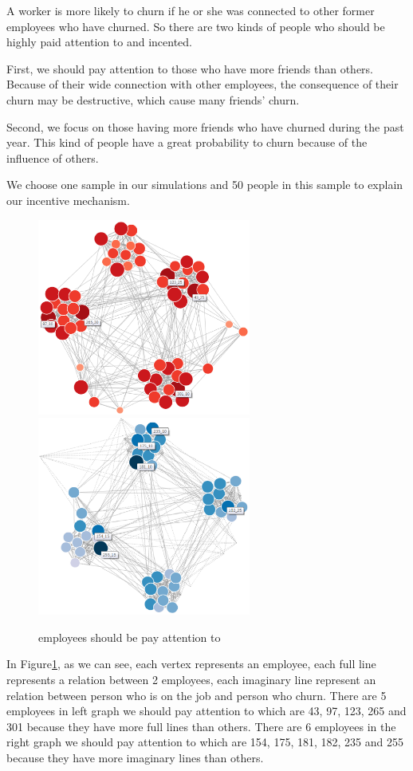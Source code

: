 \documentclass[12pt,a4paper,titlepage]{article}
\begin{document}
A worker is more likely to churn if he or she was connected to other
former employees who have churned. So there are two kinds of people
who should be highly paid attention to and incented.

First, we should pay attention to those who have more friends than
others. Because of their wide connection with other employees, the
consequence of their churn may be destructive, which cause many
friends' churn.

Second, we focus on those having more friends who have churned
during the past year. This kind of people have a great probability to
churn because of the influence of others.

We choose one sample in our simulations and 50 people in this sample
to explain our incentive mechanism.

\begin{figure}[htb]
  \centering
  \includegraphics[width=7cm]{p1.eps}
  \includegraphics[width=7cm]{p2.eps}
  \caption{employees should be pay attention
    to}\label{incentive-mechanism}
\end{figure}

In Figure\ref{incentive-mechanism}, as we can see, each vertex
represents an employee, each full line represents a relation between 2
employees, each imaginary line represent an relation between person
who is on the job and person who churn. There are 5
employees in left graph we should pay attention to which are
43, 97, 123, 265 and 301 because they have more full lines than
others. There are 6 employees in the right graph we should pay
attention to which are 154, 175, 181, 182, 235 and 255 because they
have more imaginary lines than others.
\end{document}
